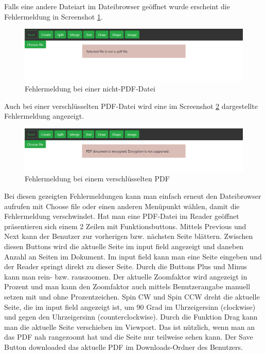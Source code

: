 Falls eine andere Dateiart im Dateibrowser geöffnet wurde erscheint die Fehlermeldung in Screenshot \ref{fig:errorfile}. 

\begin{figure}[!htb]
	\centering
	\includegraphics[width=1\textwidth]{"images/errorfile.png"}
	\caption{Fehlermeldung bei einer nicht-PDF-Datei}
	\label{fig:errorfile}
\end{figure}

Auch bei einer verschlüsselten PDF-Datei wird eine im Screenshot \ref{fig:errorcrypt} dargestellte Fehlermeldung angezeigt.

\begin{figure}[!htb]
	\centering
	\includegraphics[width=1\textwidth]{"images/errorcrypt.png"}
	\caption{Fehlermeldung bei einem verschlüsselten PDF}
	\label{fig:errorcrypt}
\end{figure}

Bei diesen gezeigten Fehlermeldungen kann man einfach erneut den Dateibrowser aufrufen mit Choose file oder einen anderen Menüpunkt wählen, damit die Fehlermeldung verschwindet. Hat man eine PDF-Datei im Reader geöffnet präsentieren sich einem 2 Zeilen mit Funktionsbuttons. Mittels Previous und Next kann der Benutzer zur vorherigen bzw. nächsten Seite blättern. Zwischen diesen Buttons wird die aktuelle Seite im input field angezeigt und daneben Anzahl an Seiten im Dokument. Im input field kann man eine Seite eingeben und der Reader springt direkt zu dieser Seite. Durch die Buttons Plus und Minus kann man rein- bzw. rauszoomen. Der aktuelle Zoomfaktor wird angezeigt in Prozent und man kann den Zoomfaktor auch mittels Benutzerangabe manuell setzen mit und ohne Prozentzeichen. Spin CW und Spin CCW dreht die aktuelle Seite, die im input field angezeigt ist, um 90 Grad im Uhrzeigersinn (clockwise) und gegen den Uhrzeigersinn (counterclockwise). Durch die Funktion Drag kann man die aktuelle Seite verschieben im Viewport. Das ist nützlich, wenn man an das PDF nah rangezoomt hat und die Seite nur teilweise sehen kann. Der Save Button downloaded das aktuelle PDF im Downloads-Ordner des Benutzers. \\

